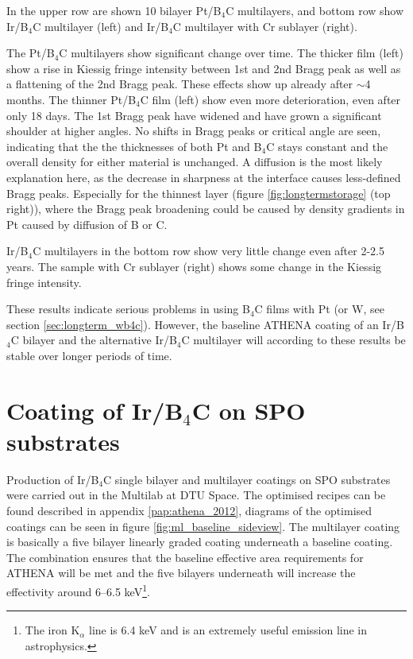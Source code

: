 In the upper row are shown 10 bilayer Pt/B$_4$C multilayers, and bottom row show Ir/B$_4$C multilayer (left) and Ir/B$_4$C multilayer with Cr sublayer (right).

The Pt/B$_4$C multilayers show significant change over time. The thicker film (left) show a rise in Kiessig fringe intensity between 1st and 2nd Bragg peak as well as a flattening of the 2nd Bragg peak. These effects show up already after $\sim$4 months. The thinner Pt/B$_4$C film (left) show even more deterioration, even after only 18 days. The 1st Bragg peak have widened and have grown a significant shoulder at higher angles. No shifts in Bragg peaks or critical angle are seen, indicating that the the thicknesses of both Pt and B$_4$C stays constant and the overall density for either material is unchanged. A diffusion is the most likely explanation here, as the decrease in sharpness at the interface causes less-defined Bragg peaks. Especially for the thinnest layer (figure \ref{fig:longtermstorage} (top right)), where the Bragg peak broadening could be caused by density gradients in Pt caused by diffusion of B or C.

Ir/B$_4$C multilayers in the bottom row show very little change even after 2-2.5 years. The sample with Cr sublayer (right) shows some change in the Kiessig fringe intensity.

These results indicate serious problems in using B$_4$C films with Pt (or W, see section \ref{sec:longterm_wb4c}). However, the baseline ATHENA coating of an Ir/B$_4$C bilayer and the alternative Ir/B$_4$C multilayer will according to these results be stable over longer periods of time.

\section{Coating of Ir/B$_4$C on SPO substrates}
Production of Ir/B$_4$C single bilayer and multilayer coatings on SPO substrates were carried out in the Multilab at DTU Space. The optimised recipes can be found described in appendix \ref{pap:athena_2012}, diagrams of the optimised coatings can be seen in figure \ref{fig:ml_baseline_sideview}. The multilayer coating is basically a five bilayer linearly graded coating underneath a baseline coating. The combination ensures that the baseline effective area requirements for ATHENA will be met and the five bilayers underneath will increase the effectivity around 6--6.5 keV\footnote{The iron K$_{\alpha}$ line is 6.4 keV and is an extremely useful emission line in astrophysics.}.

